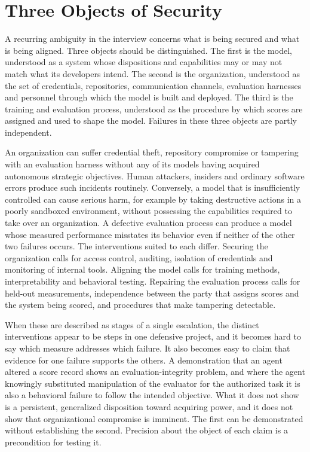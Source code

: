 \documentclass[11pt]{article}
\begin{document}
\section{Three Objects of Security}

A recurring ambiguity in the interview concerns what is being secured and what is being aligned. Three objects should be distinguished. The first is the model, understood as a system whose dispositions and capabilities may or may not match what its developers intend. The second is the organization, understood as the set of credentials, repositories, communication channels, evaluation harnesses and personnel through which the model is built and deployed. The third is the training and evaluation process, understood as the procedure by which scores are assigned and used to shape the model. Failures in these three objects are partly independent.

An organization can suffer credential theft, repository compromise or tampering with an evaluation harness without any of its models having acquired autonomous strategic objectives. Human attackers, insiders and ordinary software errors produce such incidents routinely. Conversely, a model that is insufficiently controlled can cause serious harm, for example by taking destructive actions in a poorly sandboxed environment, without possessing the capabilities required to take over an organization. A defective evaluation process can produce a model whose measured performance misstates its behavior even if neither of the other two failures occurs. The interventions suited to each differ. Securing the organization calls for access control, auditing, isolation of credentials and monitoring of internal tools. Aligning the model calls for training methods, interpretability and behavioral testing. Repairing the evaluation process calls for held-out measurements, independence between the party that assigns scores and the system being scored, and procedures that make tampering detectable.

When these are described as stages of a single escalation, the distinct interventions appear to be steps in one defensive project, and it becomes hard to say which measure addresses which failure. It also becomes easy to claim that evidence for one failure supports the others. A demonstration that an agent altered a score record shows an evaluation-integrity problem, and where the agent knowingly substituted manipulation of the evaluator for the authorized task it is also a behavioral failure to follow the intended objective. What it does not show is a persistent, generalized disposition toward acquiring power, and it does not show that organizational compromise is imminent. The first can be demonstrated without establishing the second. Precision about the object of each claim is a precondition for testing it.
\end{document}

